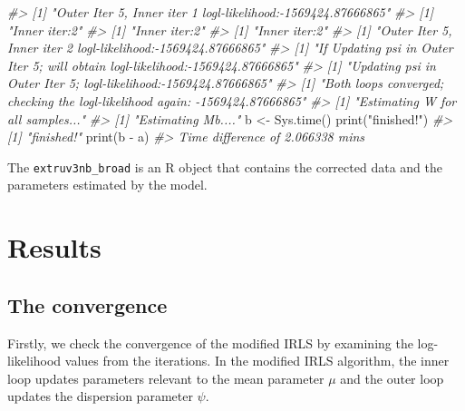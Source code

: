 \documentclass[]{article}
\newcommand{\hlstr}[1]{\textcolor[rgb]{0.251,0.627,0.251}{#1}}%
\newcommand{\hlcom}[1]{\textcolor[rgb]{0.502,0.502,0.502}{\textit{#1}}}%
\newcommand{\hlstd}[1]{\textcolor[rgb]{0.251,0.251,0.251}{#1}}%
\newenvironment{Shaded}{\begin{myshaded}}{\end{myshaded}}
\newcommand{\SpecialCharTok}[1]{\hlstr{#1}}
\newcommand{\StringTok}[1]{\hlstr{#1}}
\newcommand{\CommentTok}[1]{\hlcom{#1}}
\newcommand{\OtherTok}[1]{{#1}}
\newcommand{\FunctionTok}[1]{\hlstd{#1}}
\newcommand{\NormalTok}[1]{\hlstd{#1}}
\begin{document}
\begin{Shaded}
\begin{Highlighting}[]
\CommentTok{\#\textgreater{} [1] "Outer Iter 5, Inner iter 1 logl{-}likelihood:{-}1569424.87666865"}
\CommentTok{\#\textgreater{} [1] "Inner iter:2"}
\CommentTok{\#\textgreater{} [1] "Inner iter:2"}
\CommentTok{\#\textgreater{} [1] "Inner iter:2"}
\CommentTok{\#\textgreater{} [1] "Outer Iter 5, Inner iter 2 logl{-}likelihood:{-}1569424.87666865"}
\CommentTok{\#\textgreater{} [1] "If Updating psi in Outer Iter 5; will obtain logl{-}likelihood:{-}1569424.87666865"}
\CommentTok{\#\textgreater{} [1] "Updating psi in Outer Iter 5; logl{-}likelihood:{-}1569424.87666865"}
\CommentTok{\#\textgreater{} [1] "Both loops converged; checking the logl{-}likelihood again: {-}1569424.87666865"}
\CommentTok{\#\textgreater{} [1] "Estimating W for all samples..."}
\CommentTok{\#\textgreater{} [1] "Estimating Mb...."}
\NormalTok{b }\OtherTok{\textless{}{-}} \FunctionTok{Sys.time}\NormalTok{()}
\FunctionTok{print}\NormalTok{(}\StringTok{"finished!"}\NormalTok{)}
\CommentTok{\#\textgreater{} [1] "finished!"}
\FunctionTok{print}\NormalTok{(b }\SpecialCharTok{{-}}\NormalTok{ a)}
\CommentTok{\#\textgreater{} Time difference of 2.066338 mins}
\end{Highlighting}
\end{Shaded}

The \texttt{extruv3nb\_broad} is an R object that contains the corrected data and the parameters estimated by the model.

\section{Results}\label{results}

\subsection{The convergence}\label{the-convergence}

Firstly, we check the convergence of the modified IRLS by examining the log-likelihood values from the iterations. In the modified IRLS algorithm, the inner loop updates parameters relevant to the mean parameter \(\mu\) and the outer loop updates the dispersion parameter \(\psi\).
\end{document}
